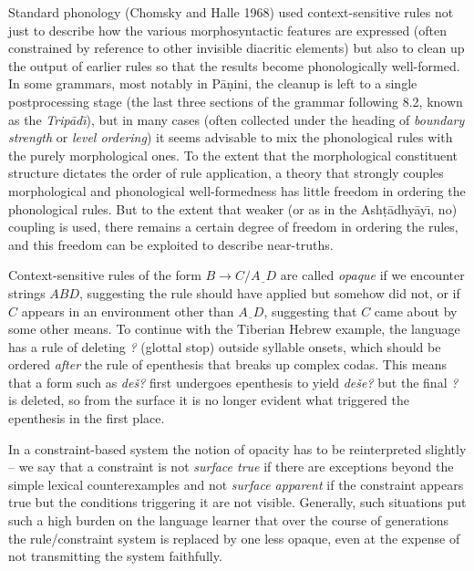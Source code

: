 Standard phonology (Chomsky and Halle 1968) used context-sensitive rules not
just to describe how the various morphosyntactic features are expressed (often
constrained by reference to other invisible diacritic elements) but also to
clean up the output of earlier rules so that the results become phonologically
well-formed. In some grammars, most notably in
P\={a}\d{n}ini, the cleanup is left to a single
postprocessing stage (the last three sections of the grammar following 8.2,
known as the {\it Trip\={a}d\={\i}}), but in many cases (often collected under
the heading of {\it boundary strength} or {\it level ordering}) it seems
advisable to mix the phonological rules with the purely morphological ones.
To the extent that the morphological constituent structure dictates the order
of rule application, a theory that strongly couples morphological and
phonological well-formedness has little freedom in ordering the phonological
rules. But to the extent that weaker (or as in the
Ash\d{t}\={a}dhy\={a}y\={\i}, no) coupling is used, there remains a certain
degree of freedom in ordering the rules, and this freedom can be exploited to
describe near-truths.

Context-sensitive rules of the form $B \rightarrow C/A\underline{\ \ }D$ are
called {\it opaque}  if we encounter strings
$ABD$, suggesting the rule should have applied but somehow did not, or if $C$
appears in an environment other than $A\underline{\ \ }D$, suggesting that $C$
came about by some other means. To continue with the Tiberian Hebrew example,
the language has a rule of deleting {\it ?} (glottal stop) outside syllable
onsets, which should be ordered {\it after} the rule of epenthesis that breaks
up complex codas.  This means that a form such as {\it de\v{s}?} first
undergoes epenthesis to yield {\it de\v{s}e?} but the final {\it ?} is
deleted, so from the surface it is no longer evident what triggered the
epenthesis in the first place.

In a constraint-based system the notion of opacity has to be reinterpreted
slightly -- we say that a constraint is not {\it surface true} if there are
exceptions beyond the simple lexical counterexamples and not {\it surface
  apparent} if the constraint appears true but the conditions triggering it
are not visible.  Generally, such situations put such a high burden on the
language learner that over the course of generations the rule/constraint
system is replaced by one less opaque, even at the expense of not transmitting
the system faithfully.

